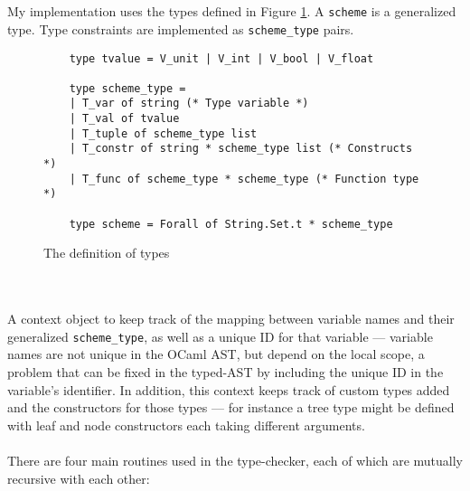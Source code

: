 \documentclass[12pt,twoside,notitlepage]{report}
\newcommand{\camlinline}{\texttt}
\begin{document}
\\\\
My implementation uses the types defined in Figure \ref{fig:types}. A \camlinline{scheme} is a generalized type. Type constraints are implemented as \camlinline{scheme_type} pairs.
\begin{figure}[h]
	\begin{verbatim}
	type tvalue = V_unit | V_int | V_bool | V_float
	
	type scheme_type =
	| T_var of string (* Type variable *)
	| T_val of tvalue
	| T_tuple of scheme_type list
	| T_constr of string * scheme_type list (* Constructs *)
	| T_func of scheme_type * scheme_type (* Function type *)
	
	type scheme = Forall of String.Set.t * scheme_type
	\end{verbatim}
	\caption{The definition of types}
	\label{fig:types}
\end{figure}
\\\\
A context object to keep track of the mapping between variable names and their generalized \camlinline{scheme_type}, as well as a unique ID for that variable --- variable names are not unique in the OCaml AST, but depend on the local scope, a problem that can be fixed in the typed-AST by including the unique ID in the variable's identifier. In addition, this context keeps track of custom types added and the constructors for those types --- for instance a tree type might be defined with leaf and node constructors each taking different arguments.
\\\\
There are four main routines used in the type-checker, each of which are mutually recursive with each other:
\end{document}
